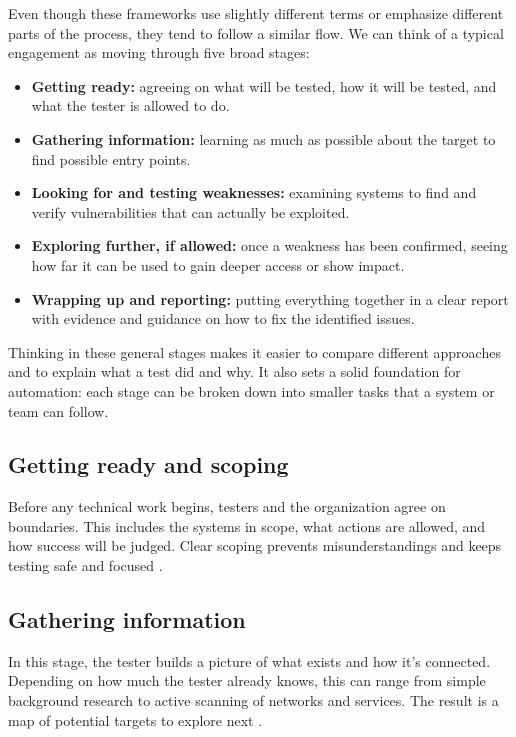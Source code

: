 Even though these frameworks use slightly different terms or emphasize different parts of the process, they tend to follow a similar flow. We can think of a typical engagement as moving through five broad stages:

\begin{itemize}
  \item \textbf{Getting ready:} agreeing on what will be tested, how it will be tested, and what the tester is allowed to do.
  \item \textbf{Gathering information:} learning as much as possible about the target to find possible entry points.
  \item \textbf{Looking for and testing weaknesses:} examining systems to find and verify vulnerabilities that can actually be exploited.
  \item \textbf{Exploring further, if allowed:} once a weakness has been confirmed, seeing how far it can be used to gain deeper access or show impact.
  \item \textbf{Wrapping up and reporting:} putting everything together in a clear report with evidence and guidance on how to fix the identified issues.
\end{itemize}

Thinking in these general stages makes it easier to compare different approaches and to explain what a test did and why. It also sets a solid foundation for automation: each stage can be broken down into smaller tasks that a system or team can follow.

\subsection{Getting ready and scoping}
\label{subsubsec:ch1-method-prep}

Before any technical work begins, testers and the organization agree on boundaries. This includes the systems in scope, what actions are allowed, and how success will be judged. Clear scoping prevents misunderstandings and keeps testing safe and focused \cite{nistSP800115,ptes}.

\subsection{Gathering information}
\label{subsubsec:ch1-method-recon}

In this stage, the tester builds a picture of what exists and how it’s connected. Depending on how much the tester already knows, this can range from simple background research to active scanning of networks and services. The result is a map of potential targets to explore next \cite{ptes,owaspWSTG}.


